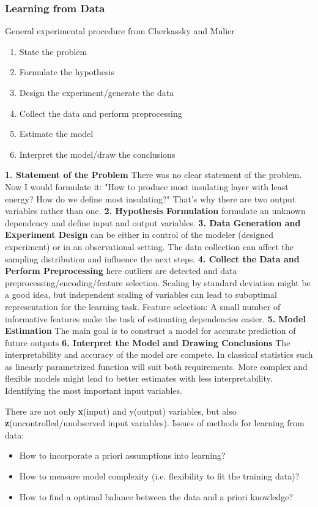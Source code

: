 {%
\subsubsection{Learning from Data}
General experimental procedure from Cherkassky and Mulier\cite{cherkassky1998learning}
\begin{enumerate}
	\item State the problem 
	\item Formulate the hypothesis
	\item Design the experiment/generate the data
	\item Collect the data and perform preprocessing
	\item Estimate the model 
	\item Interpret the model/draw the conclusions
\end{enumerate}
\textbf{1. Statement of the Problem} There was no clear statement of the problem. Now I would formulate it: "How to produce most insulating layer with least energy? How do we define most insulating?" That's why there are two output variables rather than one.
\textbf{2. Hypothesis Formulation} formulate an unknown dependency and define input and output variables.
\textbf{3. Data Generation and Experiment Design} can be either in control of the modeler (designed experiment) or in an observational setting. The data collection can affect the sampling distribution and influence the next steps. 
\textbf{4. Collect the Data and Perform Preprocessing} here outliers are detected and data preprocessing/encoding/feature selection. Scaling by standard deviation might be a good idea, but independent scaling of variables can lead to suboptimal representation for the learning task. Feature selection: A small number of informative features make the task of estimating dependencies easier. 
\textbf{5. Model Estimation} The main goal is to construct a model for accurate prediction of future outputs
\textbf{6. Interpret the Model and Drawing Conclusions} The interpretability and accuracy of the model are compete. In classical statistics such as linearly parametrized function will suit both requirements. More complex and flexible models might lead to better estimates with less interpretability. Identifying the most important input variables. \cite{cherkassky1998learning}

There are not only \textbf{x}(input) and y(output) variables, but also \textbf{z}(uncontrolled/unobserved input variables).
Issues of methods for learning from data: 
\begin{itemize}
	\item How to incorporate a priori assumptions into learning? 
	\item How to measure model complexity (i.e. flexibility to fit the training data)?
	\item How to find a optimal balance between the data and a priori knowledge? 
\end{itemize}
\cite{cherkassky1998learning}

}
